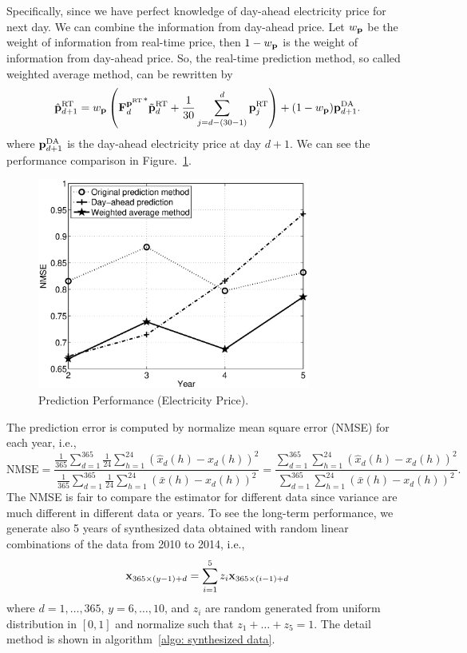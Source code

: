 Specifically, since we have perfect knowledge of day-ahead electricity price for next day. We can combine the information from day-ahead price. Let $w_{{\mathbf p}}$ be the weight of information from real-time price, then $1-w_{{\mathbf p}}$ is the weight of information from day-ahead price. So, the real-time prediction method, so called weighted average method, can be rewritten by
\begin{equation}
    \hat{{\mathbf p}}^{\text{RT}}_{d+1} = w_{{\mathbf p}}\left({{\mathbf F}^{{\mathbf p}^{\text{RT}}}_d}^*\tilde{{\mathbf p}}^{\text{RT}}_d + \frac{1}{30}\sum_{j=d-(30-1)}^{d} {\mathbf p}^{\text{RT}}_j\right) + (1-w_{{\mathbf p}}){\mathbf p}^\text{DA}_{d+1}.
\end{equation}
where ${\mathbf p}^{\text{DA}}_{d+1}$ is the day-ahead electricity price at day $d+1$. We can see the performance comparison in Figure.~\ref{fig: err_r_compare}.

\begin{figure}[ht]
  \centering
  \label{fig: err_r_compare}
  \includegraphics[width = 0.8\textwidth]{fig/err_r_compare.eps}
  \caption{Prediction Performance (Electricity Price).}
\end{figure}

The prediction error is computed by normalize mean square error (NMSE) for each year, i.e.,
\begin{equation*}
    \text{NMSE} = \frac{\frac{1}{365}\sum_{d = 1}^{365}\frac{1}{24}\sum_{h=1}^{24}(\hat x_d(h)-x_d(h))^2}{\frac{1}{365}\sum_{d = 1}^{365}\frac{1}{24}\sum_{h=1}^{24}(\bar x(h)-x_d(h))^2} = \frac{\sum_{d = 1}^{365}\sum_{h=1}^{24}(\hat x_d(h)-x_d(h))^2}{\sum_{d = 1}^{365}\sum_{h=1}^{24}(\bar x(h)-x_d(h))^2}.
\end{equation*}
The NMSE is fair to compare the estimator for different data since variance are much different in different data or years. To see the long-term performance, we generate also 5 years of synthesized data obtained with random linear combinations
of the data from 2010 to 2014, i.e.,
\begin{equation}
    {\mathbf x}_{365\times(y-1)+d} = \sum_{i=1}^5 z_i{\mathbf x}_{365\times(i-1)+d}
\end{equation}
where $d=1,\ldots,365$, $y=6,\ldots,10$, and $z_i$ are random generated from uniform distribution in $[0,1]$ and normalize such that $z_1+\ldots+z_5=1$. The detail method is shown in algorithm~\ref{algo: synthesized data}.

